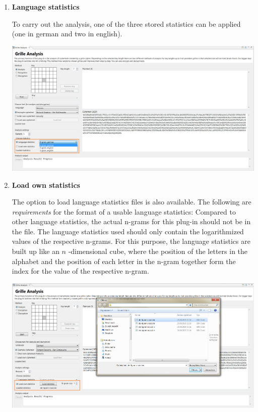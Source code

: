 \documentclass[fontsize=12pt, DIV=15, parskip=half-]{scrartcl}
\theoremstyle{break}
\begin{document}
\begin{enumerate}[label=(\alph*), leftmargin=*]
\item \textbf{Language statistics}

To carry out the analysis, one of the three stored statistics can be applied (one in german and two in english).

\includegraphics[scale=0.4]{enFleissnerStatisticsExample.png}


\item \textbf{Load own statistics}

The option to load language statistics files is also available. The following are \textit{requirements} for the format of a usable language statistics: Compared to other language statistics, the actual n-grams for this plug-in should not be in the file. The language statistics used should only contain the logarithmized values of the respective n-grams. For this purpose, the language statistics are built up like an $n$ -dimensional cube, where the position of the letters in the alphabet and the position of each letter in the n-gram together form the index for the value of the respective n-gram.


\includegraphics[scale=0.4]{enFleissnerOwnStatistics.png}


\end{enumerate}
\end{document}
